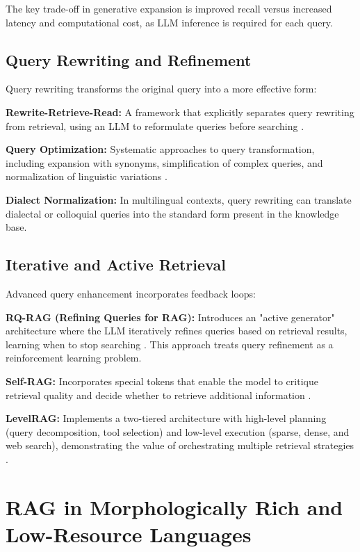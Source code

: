 The key trade-off in generative expansion is improved recall versus increased latency and computational cost, as LLM inference is required for each query.

\subsection{Query Rewriting and Refinement}

Query rewriting transforms the original query into a more effective form:

\textbf{Rewrite-Retrieve-Read:} A framework that explicitly separates query rewriting from retrieval, using an LLM to reformulate queries before searching \cite{ma_2023_query}.

\textbf{Query Optimization:} Systematic approaches to query transformation, including expansion with synonyms, simplification of complex queries, and normalization of linguistic variations \cite{song_2024_a, louis_2024_query}.

\textbf{Dialect Normalization:} In multilingual contexts, query rewriting can translate dialectal or colloquial queries into the standard form present in the knowledge base.

\subsection{Iterative and Active Retrieval}

Advanced query enhancement incorporates feedback loops:

\textbf{RQ-RAG (Refining Queries for RAG):} Introduces an "active generator" architecture where the LLM iteratively refines queries based on retrieval results, learning when to stop searching \cite{chan_2024_rqrag}. This approach treats query refinement as a reinforcement learning problem.

\textbf{Self-RAG:} Incorporates special tokens that enable the model to critique retrieval quality and decide whether to retrieve additional information \cite{asai_2024_selfrag}.

\textbf{LevelRAG:} Implements a two-tiered architecture with high-level planning (query decomposition, tool selection) and low-level execution (sparse, dense, and web search), demonstrating the value of orchestrating multiple retrieval strategies \cite{wang_2025_levelrag}.

\section{RAG in Morphologically Rich and Low-Resource Languages}


